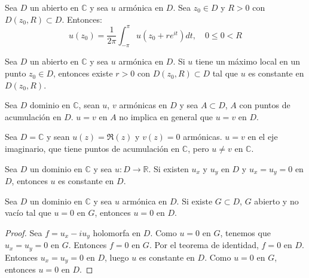 
\begin{theorem}
    Sea $D$ un abierto en $\mathbb{C}$ y sea $u$ armónica en $D$.
    Sea $z_0 \in D$ y $R > 0$ con $D(z_0, R) \subset D$.
    Entonces:
    $$u(z_0) = \frac{1}{2\pi} \int_{-\pi}^\pi u(z_0 + re^{it})dt, \quad 0 \leq 0 < R$$
\end{theorem}


\begin{theorem}
    Sea $D$ un abierto en $\mathbb{C}$ y sea $u$ armónica en $D$.
    Si $u$ tiene un máximo local en un punto $z_0 \in D$, entonces existe $r > 0$ con $D(z_0, R) \subset D$ tal que $u$ es constante en $D(z_0, R)$.
\end{theorem}


Sea $D$ dominio en $\mathbb{C}$, sean $u$, $v$ armónicas en $D$ y sea $A \subset D$, $A$ con puntos de acumulación en $D$.
$u = v$ en $A$ no implica en general que $u = v$ en $D$.

\begin{example}[Contraejemplo]
    Sea $D = \mathbb{C}$ y sean $u(z) = \Re(z)$ y $v(z) = 0$ armónicas.
    $u = v$ en el eje imaginario, que tiene puntos de acumulación en $\mathbb{C}$, pero $u \neq v$ en $\mathbb{C}$.
\end{example}

\begin{remark}
    Sea $D$ un dominio en $\mathbb{C}$ y sea $u: D \to \mathbb{R}$.
    Si existen $u_x$ y $u_y$ en $D$ y $u_x = u_y = 0$ en $D$, entonces $u$ es constante en $D$.
\end{remark}

\begin{theorem}
    Sea $D$ un dominio en $\mathbb{C}$ y sea $u$ armónica en $D$.
    Si existe $G \subset D$, $G$ abierto y no vacío tal que $u = 0$ en $G$, entonces $u = 0$ en $D$.
\end{theorem}

\begin{proof}
    Sea $f = u_x - iu_y$ holomorfa en $D$.
    Como $u = 0$ en $G$, tenemos que $u_x = u_y = 0$ en $G$.
    Entonces $f = 0$ en $G$.
    Por el teorema de identidad, $f = 0$ en $D$.
    Entonces $u_x = u_y = 0$ en $D$, luego $u$ es constante en $D$.
    Como $u = 0$ en $G$, entonces $u = 0$ en $D$.
\end{proof}

